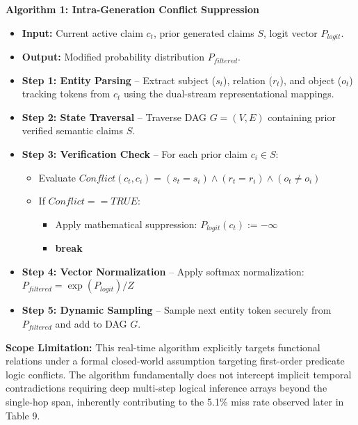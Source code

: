 \documentclass[11pt,a4paper]{article}
\begin{document}
\vspace{2mm}
\noindent\textbf{Algorithm 1: Intra-Generation Conflict Suppression}

\begin{itemize}

\item \textbf{Input:} Current active claim $c_t$, prior generated claims $S$, logit vector $P_{logit}$.

\item \textbf{Output:} Modified probability distribution $P_{filtered}$.

\item \textbf{Step 1: Entity Parsing} -- Extract subject ($s_t$), relation ($r_t$), and object ($o_t$) tracking tokens from $c_t$ using the dual-stream representational mappings.

\item \textbf{Step 2: State Traversal} -- Traverse DAG $G = (V, E)$ containing prior verified semantic claims $S$.

\item \textbf{Step 3: Verification Check} -- For each prior claim $c_i \in S$:

\begin{itemize}

\item Evaluate $Conflict(c_t, c_i) = (s_t = s_i) \land (r_t = r_i) \land (o_t \neq o_i)$

\item If $Conflict == TRUE$:

\begin{itemize}\item Apply mathematical suppression: $P_{logit}(c_t) := -\infty$\item \textbf{break}\end{itemize}

\end{itemize}

\item \textbf{Step 4: Vector Normalization} -- Apply softmax normalization: $P_{filtered} = \exp(P_{logit}) / Z$

\item \textbf{Step 5: Dynamic Sampling} -- Sample next entity token securely from $P_{filtered}$ and add to DAG $G$.

\end{itemize}

\textbf{Scope Limitation:} This real-time algorithm explicitly targets functional relations under a formal closed-world assumption targeting first-order predicate logic conflicts. The algorithm fundamentally does not intercept implicit temporal contradictions requiring deep multi-step logical inference arrays beyond the single-hop span, inherently contributing to the 5.1\% miss rate observed later in Table 9.
\end{document}
